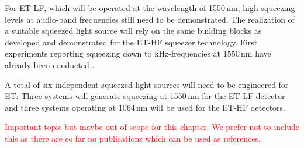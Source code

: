 For ET-LF, which will be operated at the wavelength of 1550\,nm, high squeezing levels at audio-band frequencies still need to be demonstrated. The realization of a suitable squeezed light source will rely on the same building blocks as developed and demonstrated for the ET-HF squeezer technology. First experiments reporting squeezing down to kHz-frequencies at 1550\,nm have already been conducted \cite{Mehmet2011,Schoenbeck2018phd}.

A total of six independent squeezed light sources will need to be engineered for ET: Three systems will generate squeezing at 1550\,nm for the ET-LF detector and three systems operating at 1064\,nm will be used for the ET-HF detectors. 


\textcolor{red}{Important topic but maybe out-of-scope for this chapter. We prefer not to include this as there are so far no publications which can be used as references.}